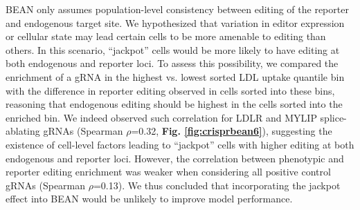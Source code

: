 \documentclass[a4paper, titlepage, openright]{book}
\begin{document}
BEAN only assumes population-level consistency between editing of the reporter and endogenous target site. We hypothesized that variation in editor expression or cellular state may lead certain cells to be more amenable to editing than others. In this scenario, “jackpot” cells would be more likely to have editing at both endogenous and reporter loci. To assess this possibility, we compared the enrichment of a gRNA in the highest vs. lowest sorted LDL uptake quantile bin with the difference in reporter editing observed in cells sorted into these bins, reasoning that endogenous editing should be highest in the cells sorted into the enriched bin. We indeed observed such correlation for LDLR and MYLIP splice-ablating gRNAs (Spearman $\rho$=0.32, \textbf{Fig. \ref{fig:crisprbean6}}), suggesting the existence of cell-level factors leading to “jackpot” cells with higher editing at both endogenous and reporter loci. However, the correlation between phenotypic and reporter editing enrichment was weaker when considering all positive control gRNAs (Spearman $\rho$=0.13). We thus concluded that incorporating the jackpot effect into BEAN would be unlikely to improve model performance.
\end{document}
